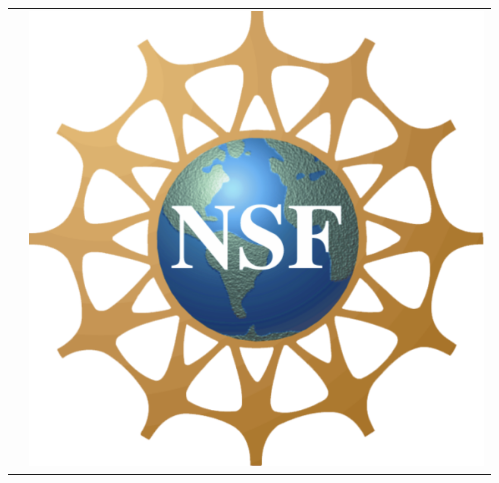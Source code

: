 \documentclass[final]{beamer}
\begin{document}
\begin{frame}[t]
\begin{columns}
\begin{column}{0.3\paperwidth}
\begin{tabular}{cc}
& 
\begin{minipage}{2.5in}
\includegraphics[scale=.4]{NSF_logo.png}
\end{minipage}
\end{tabular}
		\end{column}
		
		\begin{column}{0.3\paperwidth}


\end{column}
\end{columns}
\end{frame}
\end{document}
